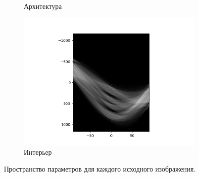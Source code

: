 \documentclass[a4paper, 16pt]{article}
\begin{document}
\begin{figure}[htbp]
\begin{subfigure}{0.3\textwidth}
            \caption{Архитектура}
            \label{fig:canny_par_space_i2}
        \end{subfigure}
        \hfill
        \begin{subfigure}{0.3\textwidth}
            \centering
            \includegraphics[width=\linewidth]{canny_par_space_i3.png}
            \caption{Интерьер}
            \label{fig:canny_par_space_i3}
        \end{subfigure}
        \caption{Пространство параметров для каждого исходного изображения.}
        \label{fig:canny_par_space_is}
    \end{figure}
\end{document}

